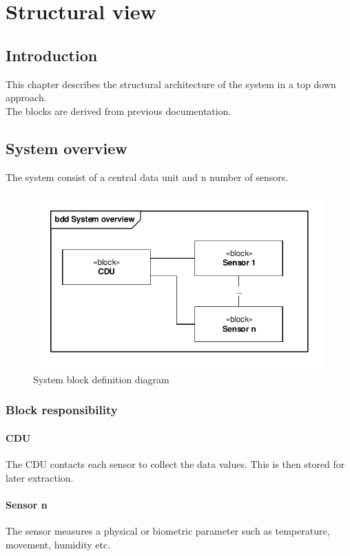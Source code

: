 \chapter{Structural view}

\section{Introduction}
This chapter describes the structural architecture of the system in a top down approach.\\
The blocks are derived from previous documentation.


\section{System overview}
The system consist of a central data unit and n number of sensors.
\begin{figure}[hbpt]
\centering
\includegraphics[width=.9\textwidth]{billeder/systembdd}
\caption{System block definition diagram}
\label{systembdd}
\end{figure}

\subsection{Block responsibility}
\subsubsection{CDU}
The CDU contacts each sensor to collect the data values. This is then stored for later extraction.

\subsubsection{Sensor n}
The sensor measures a physical or biometric parameter such as temperature, movement, humidity etc.

